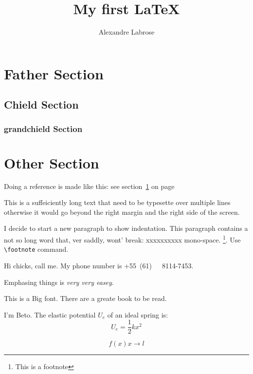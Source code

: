 \documentclass[letterpaper, twocolumn, twoside]{article}
\title{My f{}irst \LaTeX{}}
\author{Alexandre Labrose}
\newcommand{\beto}{I'm {\huge Beto}.}
\begin{document}
\maketitle
\section{Father Section}\label{here}
\subsection{Chield Section}
\subsubsection{grandchield Section}
\section{Other Section}
Doing a reference is made like this: see section~\ref{here} on page~\pageref{here}

This is a suffeiciently long text that need to be typesette over multiple lines otherwise it would go beyond the right margin and the right side of the screen.

I decide to start a new paragraph to show indentation. This paragraph contains a not so long word that, ver saddly, wont' break: xxxxxxxxxx mono-space.
\footnote{This is a footnote}. Use \verb|\footnote| command.

Hi \hspace{.20em}chicks, call me. My phone number is \mbox{+55 (61)\ \ \ 8114-7453}.

Emphasing things is \emph{very \emph{very} easey}.

This is a {\Huge{Big}} font.
There are a greate book \cite{myart2015} to be read.


\beto
The elastic potential $U_e$ of an ideal spring is: $$ U_e = \frac{1}{2}kx^2 $$

$$
f(x) x \rightarrow l 
$$


\end{document}
